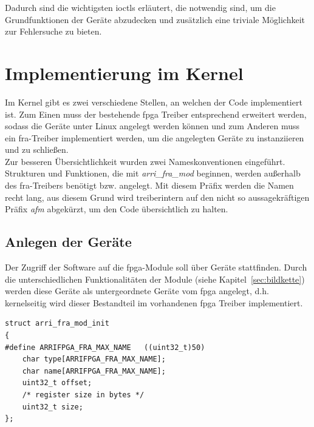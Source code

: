 Dadurch sind die wichtigsten \ac{ioctl}s erläutert, die notwendig sind, um die Grundfunktionen der Geräte abzudecken und zusätzlich eine triviale Möglichkeit zur Fehlersuche zu bieten.

\section{Implementierung im Kernel}\label{sec:kernel}
Im Kernel gibt es zwei verschiedene Stellen, an welchen der Code implementiert ist. Zum Einen muss der bestehende \ac{fpga} Treiber entsprechend erweitert werden, sodass die Geräte unter Linux angelegt werden können und zum Anderen muss ein \ac{fra}-Treiber implementiert werden, um die angelegten Geräte zu instanziieren und zu schließen. \\

Zur besseren Übersichtlichkeit wurden zwei Nameskonventionen eingeführt. Strukturen und Funktionen, die mit \textit{arri\_fra\_mod} beginnen, werden außerhalb des \ac{fra}-Treibers benötigt bzw. angelegt. Mit diesem Präfix werden die Namen recht lang, aus diesem Grund wird treiberintern auf den nicht so aussagekräftigen Präfix \textit{afm} abgekürzt, um den Code übersichtlich zu halten.




\subsection{Anlegen der Geräte}
Der Zugriff der Software auf die \ac{fpga}-Module soll über Geräte stattfinden. Durch die unterschiedlichen Funktionalitäten der Module (siehe Kapitel~\ref{sec:bildkette}) werden diese Geräte als untergeordnete Geräte vom \ac{fpga} angelegt, d.h. kernelseitig wird dieser Bestandteil im vorhandenen \ac{fpga} Treiber implementiert. 

\begin{lstfloat}
\begin{lstlisting}
struct arri_fra_mod_init 
{
#define ARRIFPGA_FRA_MAX_NAME   ((uint32_t)50)
	char type[ARRIFPGA_FRA_MAX_NAME];
	char name[ARRIFPGA_FRA_MAX_NAME];
	uint32_t offset;
	/* register size in bytes */
	uint32_t size;
};
\end{lstlisting}
\end{lstfloat}

